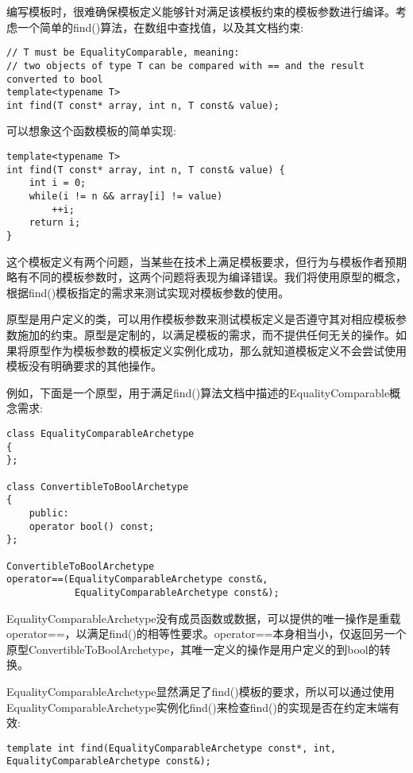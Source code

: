 编写模板时，很难确保模板定义能够针对满足该模板约束的模板参数进行编译。考虑一个简单的find()算法，在数组中查找值，以及其文档约束:

\begin{lstlisting}[style=styleCXX]
// T must be EqualityComparable, meaning:
// two objects of type T can be compared with == and the result converted to bool
template<typename T>
int find(T const* array, int n, T const& value);
\end{lstlisting}

可以想象这个函数模板的简单实现:

\begin{lstlisting}[style=styleCXX]
template<typename T>
int find(T const* array, int n, T const& value) {
	int i = 0;
	while(i != n && array[i] != value)
		++i;
	return i;
}
\end{lstlisting}

这个模板定义有两个问题，当某些在技术上满足模板要求，但行为与模板作者预期略有不同的模板参数时，这两个问题将表现为编译错误。我们将使用原型的概念，根据find()模板指定的需求来测试实现对模板参数的使用。

原型是用户定义的类，可以用作模板参数来测试模板定义是否遵守其对相应模板参数施加的约束。原型是定制的，以满足模板的需求，而不提供任何无关的操作。如果将原型作为模板参数的模板定义实例化成功，那么就知道模板定义不会尝试使用模板没有明确要求的其他操作。

例如，下面是一个原型，用于满足find()算法文档中描述的EqualityComparable概念需求:

\begin{lstlisting}[style=styleCXX]
class EqualityComparableArchetype
{
};

class ConvertibleToBoolArchetype
{
	public:
	operator bool() const;
};

ConvertibleToBoolArchetype
operator==(EqualityComparableArchetype const&,
			EqualityComparableArchetype const&);
\end{lstlisting}

EqualityComparableArchetype没有成员函数或数据，可以提供的唯一操作是重载operator==，以满足find()的相等性要求。operator==本身相当小，仅返回另一个原型ConvertibleToBoolArchetype，其唯一定义的操作是用户定义的到bool的转换。

EqualityComparableArchetype显然满足了find()模板的要求，所以可以通过使用EqualityComparableArchetype实例化find()来检查find()的实现是否在约定末端有效:

\begin{lstlisting}[style=styleCXX]
template int find(EqualityComparableArchetype const*, int,
EqualityComparableArchetype const&);
\end{lstlisting}


